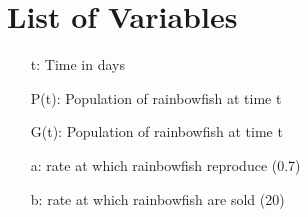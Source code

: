 \section*{List of Variables}

\begin{itemize}
    \item[t:] Time in days
    \item[P(t):] Population of rainbowfish at time t
    \item[G(t):] Population of rainbowfish at time t
    \item[a:] rate at which rainbowfish reproduce (0.7)
    \item[b:] rate at which rainbowfish are sold (20)
\end{itemize}